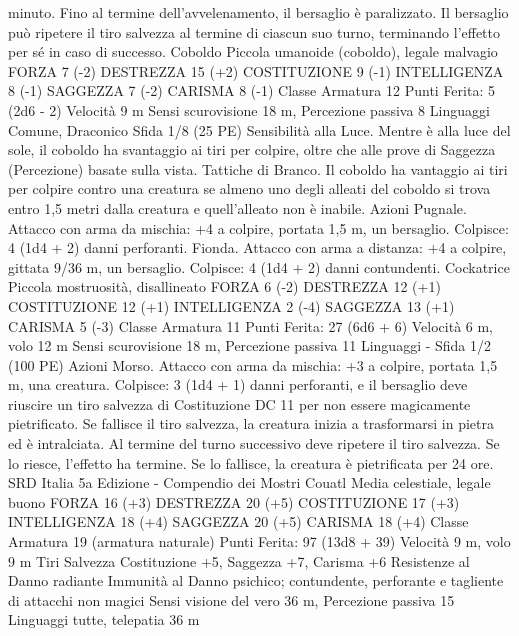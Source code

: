 \begin{multicols}{2}
minuto. Fino al termine dell’avvelenamento, il bersaglio è
paralizzato. Il bersaglio può ripetere il tiro salvezza al termine di
ciascun suo turno, terminando l’effetto per sé in caso di successo.
Coboldo
Piccola umanoide (coboldo), legale malvagio
FORZA 7 (-2)
DESTREZZA 15 (+2)
COSTITUZIONE 9 (-1)
INTELLIGENZA 8 (-1)
SAGGEZZA 7 (-2)
CARISMA 8 (-1)
Classe Armatura 12
\hspace*{0pt}\hfill{Punti Ferita}: 5 (2d6 - 2)
Velocità 9 m
Sensi scurovisione 18 m, Percezione passiva 8
Linguaggi Comune, Draconico
Sfida 1/8 (25 PE)
Sensibilità alla Luce. Mentre è alla luce del sole, il coboldo ha
svantaggio ai tiri per colpire, oltre che alle prove di Saggezza
(Percezione) basate sulla vista.
Tattiche di Branco. Il coboldo ha vantaggio ai tiri per colpire
contro una creatura se almeno uno degli alleati del coboldo si
trova entro 1,5 metri dalla creatura e quell’alleato non è inabile.
Azioni
Pugnale. Attacco con arma da mischia: +4 a colpire, portata 1,5
m, un bersaglio.
Colpisce: 4 (1d4 + 2) danni perforanti.
Fionda. Attacco con arma a distanza: +4 a colpire, gittata 9/36
m, un bersaglio.
Colpisce: 4 (1d4 + 2) danni contundenti.
Cockatrice
Piccola mostruosità, disallineato
FORZA 6 (-2)
DESTREZZA 12 (+1)
COSTITUZIONE 12 (+1)
INTELLIGENZA 2 (-4)
SAGGEZZA 13 (+1)
CARISMA 5 (-3)
Classe Armatura 11
\hspace*{0pt}\hfill{Punti Ferita}: 27 (6d6 + 6)
Velocità 6 m, volo 12 m
Sensi scurovisione 18 m, Percezione passiva 11
Linguaggi -
Sfida 1/2 (100 PE)
Azioni
Morso. Attacco con arma da mischia: +3 a colpire, portata 1,5
m, una creatura.
Colpisce: 3 (1d4 + 1) danni perforanti, e il bersaglio deve
riuscire un tiro salvezza di Costituzione DC 11 per non essere
magicamente pietrificato. Se fallisce il tiro salvezza, la creatura
inizia a trasformarsi in pietra ed è intralciata. Al termine del
turno successivo deve ripetere il tiro salvezza. Se lo riesce,
l’effetto ha termine. Se lo fallisce, la creatura è pietrificata per 24
ore.
SRD Italia 5a Edizione - Compendio dei Mostri
Couatl
Media celestiale, legale buono
FORZA 16 (+3)
DESTREZZA 20 (+5)
COSTITUZIONE 17 (+3)
INTELLIGENZA 18 (+4)
SAGGEZZA 20 (+5)
CARISMA 18 (+4)
Classe Armatura 19 (armatura naturale)
\hspace*{0pt}\hfill{Punti Ferita}: 97 (13d8 + 39)
Velocità 9 m, volo 9 m
Tiri Salvezza Costituzione +5, Saggezza +7, Carisma +6
Resistenze al Danno radiante
Immunità al Danno psichico; contundente, perforante e
tagliente di attacchi non magici
Sensi visione del vero 36 m, Percezione passiva 15
Linguaggi tutte, telepatia 36 m

\end{multicols}
